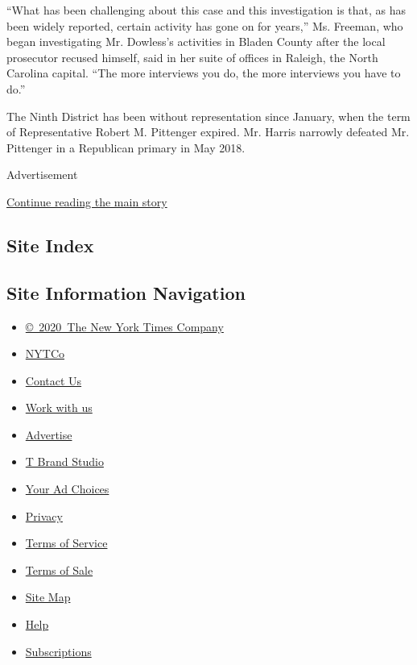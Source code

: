 ``What has been challenging about this case and this investigation is
that, as has been widely reported, certain activity has gone on for
years,'' Ms. Freeman, who began investigating Mr. Dowless's activities
in Bladen County after the local prosecutor recused himself, said in her
suite of offices in Raleigh, the North Carolina capital. ``The more
interviews you do, the more interviews you have to do.''

The Ninth District has been without representation since January, when
the term of Representative Robert M. Pittenger expired. Mr. Harris
narrowly defeated Mr. Pittenger in a Republican primary in May 2018.

Advertisement

\protect\hyperlink{after-bottom}{Continue reading the main story}

\hypertarget{site-index}{%
\subsection{Site Index}\label{site-index}}

\hypertarget{site-information-navigation}{%
\subsection{Site Information
Navigation}\label{site-information-navigation}}

\begin{itemize}
\tightlist
\item
  \href{https://help.nytimes3xbfgragh.onion/hc/en-us/articles/115014792127-Copyright-notice}{©~2020~The
  New York Times Company}
\end{itemize}

\begin{itemize}
\tightlist
\item
  \href{https://www.nytco.com/}{NYTCo}
\item
  \href{https://help.nytimes3xbfgragh.onion/hc/en-us/articles/115015385887-Contact-Us}{Contact
  Us}
\item
  \href{https://www.nytco.com/careers/}{Work with us}
\item
  \href{https://nytmediakit.com/}{Advertise}
\item
  \href{http://www.tbrandstudio.com/}{T Brand Studio}
\item
  \href{https://www.nytimes3xbfgragh.onion/privacy/cookie-policy\#how-do-i-manage-trackers}{Your
  Ad Choices}
\item
  \href{https://www.nytimes3xbfgragh.onion/privacy}{Privacy}
\item
  \href{https://help.nytimes3xbfgragh.onion/hc/en-us/articles/115014893428-Terms-of-service}{Terms
  of Service}
\item
  \href{https://help.nytimes3xbfgragh.onion/hc/en-us/articles/115014893968-Terms-of-sale}{Terms
  of Sale}
\item
  \href{https://spiderbites.nytimes3xbfgragh.onion}{Site Map}
\item
  \href{https://help.nytimes3xbfgragh.onion/hc/en-us}{Help}
\item
  \href{https://www.nytimes3xbfgragh.onion/subscription?campaignId=37WXW}{Subscriptions}
\end{itemize}
